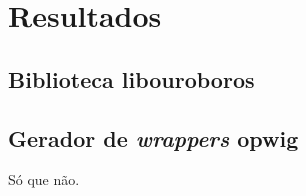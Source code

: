 \chapter{Resultados}
\label{sec:resultados}
\cite{xtr:00}

\section{Biblioteca \textbf{libouroboros}}


\section{Gerador de \emph{wrappers} \textbf{opwig}}

Só que não.
